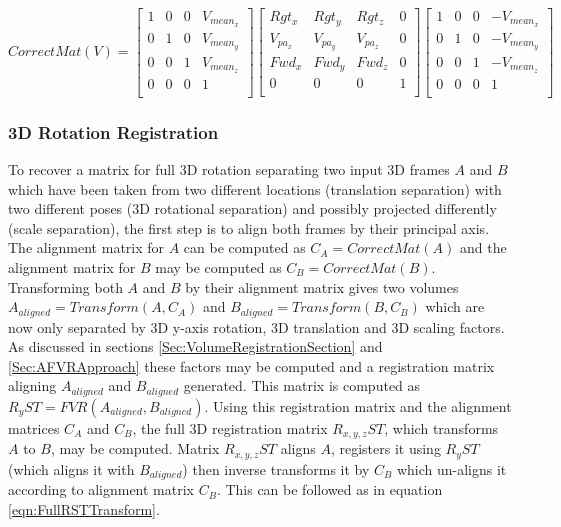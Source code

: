 \begin{equation} \label{eqn:CorrectUpMat}
CorrectMat(V) = \left[
\begin{array}{cccc}
1 & 0 & 0 & V_{mean_x} \\
0 & 1 & 0 & V_{mean_y} \\
0 & 0 & 1 & V_{mean_z} \\
0 & 0 & 0 & 1 \\
\end{array}
\right] \left[
\begin{array}{cccc}
Rgt_x & Rgt_y & Rgt_z & 0 \\
V_{pa_x} & V_{pa_y} & V_{pa_z} & 0 \\
Fwd_x & Fwd_y & Fwd_z & 0 \\
0 & 0 & 0 & 1 \\
\end{array}
\right] \left[
\begin{array}{cccc}
1 & 0 & 0 & -V_{mean_x} \\
0 & 1 & 0 & -V_{mean_y} \\
0 & 0 & 1 & -V_{mean_z} \\
0 & 0 & 0 & 1 \\
\end{array}
\right]
\end{equation}

\subsubsection{3D Rotation Registration}

To recover a matrix for full 3D rotation separating two input 3D frames $A$ and $B$ which have been taken from two different locations (translation separation) with two different poses (3D rotational separation) and possibly projected differently (scale separation), the first step is to align both frames by their principal axis. The alignment matrix for $A$ can be computed as $C_A = CorrectMat(A)$ and the alignment matrix for $B$ may be computed as $C_B = CorrectMat(B)$. Transforming both $A$ and $B$ by their alignment matrix gives two volumes $A_{aligned} = Transform(A, C_A)$ and $B_{aligned} = Transform(B, C_B)$ which are now only separated by 3D y-axis rotation, 3D translation and 3D scaling factors. As discussed in sections \ref{Sec:VolumeRegistrationSection} and \ref{Sec:AFVRApproach} these factors may be computed and a registration matrix aligning $A_{aligned}$ and $B_{aligned}$ generated. This matrix is computed as $R_{y}ST = FVR(A_{aligned},B_{aligned})$. Using this registration matrix and the alignment matrices $C_{A}$ and $C_{B}$, the full 3D registration matrix $R_{x,y,z}ST$, which transforms $A$ to $B$, may be computed. Matrix $R_{x,y,z}ST$ aligns $A$, registers it using $R_{y}ST$ (which aligns it with $B_{aligned}$) then inverse transforms it by $C_{B}$ which un-aligns it according to alignment matrix $C_B$. This can be followed as in equation \ref{eqn:FullRSTTransform}. \\



